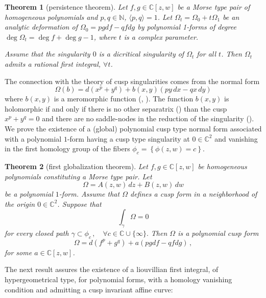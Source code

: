 \documentclass[11pt,a4paper]{amsart}
\newtheorem{theorem}{Theorem}[section]
\theoremstyle{definition}
\begin{document}
\begin{theorem}[persistence theorem]
\label{theorem:persistence}
Let \(f,g \in \mathbb C[z,w]\) be a Morse type pair of homogeneous polynomials  and 
\(p,q \in \mathbb N\), \(\langle p,q \rangle = 1\).
Let $\Omega_t = \Omega_0 + t \Omega_1
$
be an analytic deformation of
$
\Omega_0 = p g df - q f dg
$
by polynomial 1-forms of degree
$
\deg \Omega_t = \deg f + \deg g - 1$, where $t$ is a complex parameter.

Assume that the singularity \(0\) is a dicritical singularity of \(\Omega_t\) for all \(t\).
Then \(\Omega_t\) admits a rational first integral, $\forall t$.
\end{theorem}

The connection with the theory of cusp singularities comes from the normal
form
\[
\Omega(b) = d(x^p + y^q) + b(x,y)(p y\,dx - q x\,dy)
\]
where $b(x,y)$ is a meromorphic function (\cite{Cerveau-Moussu}, \cite{CerveauLoray1998}).
The function $b(x,y)$ is holomorphic if and only if there is no other separatrix (\cite{Camacho-Sad}) than the
cusp $x^p +  y^q = 0$ and there are no saddle-nodes in the reduction of the
singularity (\cite{Cerveau-Moussu}).
We prove the existence of a (global) polynomial cusp type normal form associated with
a polynomial $1$-form having a cusp type singularity at $0 \in \mathbb{C}^2$
and vanishing in the first homology group of the fibers
$\phi_c = \left\{ {\phi(z,w)} = c \right\}.$



\begin{theorem}[first globalization theorem]
\label{theorem:firstglobalizationcusp}
Let $f,g\in\mathbb{C}[z,w]$ be homogeneous
polynomials constituting a Morse type pair.
Let
\[
\Omega = A(z,w)\,dz + B(z,w)\,dw
\]
be a polynomial $1$-form. Assume that $\Omega$ defines a cusp form in a neighborhood of the origin 
$0  \in \mathbb C^2$. 
Suppose that
\[
\int_\gamma \Omega = 0
\]
for every closed path
$
\gamma \subset
\phi_c\,, 
\quad
\forall c\in\mathbb{C}\cup\{\infty\}.
$
Then $\Omega$ is a polynomial cusp form 
\[
\Omega
=    d(f^p+g^q) + a(pgdf - q f dg)\,,
\]
for some $a\in \mathbb C[z,w]$.
\end{theorem}


The next result assures the existence of a liouvillian first integral, of hypergeometrical type, 
for polynomial forms, with a homology vanishing condition and admitting a cusp invariant affine curve:
\end{document}
